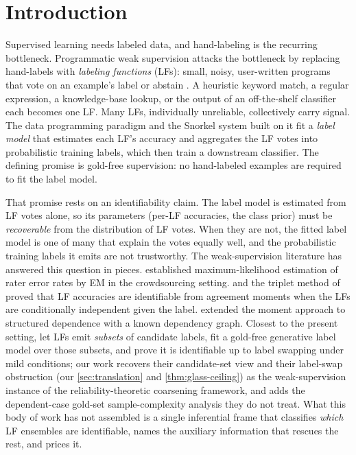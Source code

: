 \section{Introduction}
\label{sec:intro}

Supervised learning needs labeled data, and hand-labeling is the
recurring bottleneck. Programmatic weak supervision attacks the
bottleneck by replacing hand-labels with \emph{labeling functions}
(LFs): small, noisy, user-written programs that vote on an example's
label or abstain \citep{ratner2016data,ratner2017snorkel}. A heuristic
keyword match, a regular expression, a knowledge-base lookup, or the
output of an off-the-shelf classifier each becomes one LF. Many LFs,
individually unreliable, collectively carry signal. The data
programming paradigm \citep{ratner2016data} and the Snorkel system
built on it \citep{ratner2017snorkel} fit a \emph{label model} that
estimates each LF's accuracy and aggregates the LF votes into
probabilistic training labels, which then train a downstream
classifier. The defining promise is gold-free supervision: no
hand-labeled examples are required to fit the label model.

That promise rests on an identifiability claim. The label model is
estimated from LF votes alone, so its parameters (per-LF accuracies,
the class prior) must be \emph{recoverable} from the distribution of
LF votes. When they are not, the fitted label model is one of many
that explain the votes equally well, and the probabilistic training
labels it emits are not trustworthy. The weak-supervision literature
has answered this question in pieces. \citet{dawid1979maximum}
established maximum-likelihood estimation of rater error rates by EM
in the crowdsourcing setting. \citet{ratner2016data} and the triplet
method of \citet{fu2020fast} proved that LF accuracies are
identifiable from agreement moments when the LFs are conditionally
independent given the label. \citet{ratner2019training} extended the
moment approach to structured dependence with a known dependency
graph. Closest to the present setting, \citet{yu2022nplm} let LFs emit
\emph{subsets} of candidate labels, fit a gold-free generative label
model over those subsets, and prove it is identifiable up to label
swapping under mild conditions; our work recovers their candidate-set
view and their label-swap obstruction (our \cref{sec:translation} and
\cref{thm:glass-ceiling}) as the weak-supervision instance of the
reliability-theoretic coarsening framework, and adds the
dependent-case gold-set sample-complexity analysis they do not treat.
What this body of work has not assembled is a single inferential frame
that classifies \emph{which} LF ensembles are identifiable, names the
auxiliary information that rescues the rest, and prices it.

